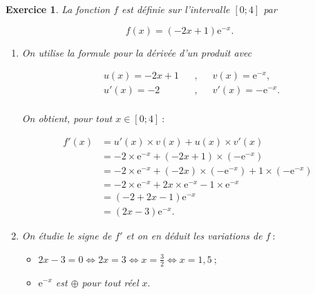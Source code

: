 \documentclass[10pt]{article}
\newtheorem{exo}{Exercice}
\begin{document}
\begin{exo}

La fonction $f$ est définie sur l'intervalle $\left[0;4\right]$ par

\[ f(x) = (-2x+1)\text{e}^{-x}.\]

\begin{enumerate}
\item  On utilise la formule pour la dérivée d'un produit avec

\begin{align*}
&u(x)=-2x+1&&,&& v(x)=\text{e}^{-x}, \\
& u'(x)=-2&&, &&v'(x)=-\text{e}^{-x}.\\
\end{align*}

On obtient, pour tout $x\in\left[0;4\right]~:$


\begin{align*}f'(x)&=u'(x)\times v(x)+u(x)\times v'(x)\\
&=-2\times\text{e}^{-x}+\left(-2x+1\right)\times \left(-\text{e}^{-x}\right)\\
&=-2\times\text{e}^{-x}+(-2x)\times\left(-\text{e}^{-x}\right)+1\times\left(-\text{e}^{-x}\right)\\
&=-2\times\text{e}^{-x}+2x\times\text{e}^{-x}-1\times\text{e}^{-x}\\
&=\left(-2+2x-1\right)\text{e}^{-x}\\
&=\left(2x-3\right)\text{e}^{-x}.
\end{align*}

\item On étudie le signe de $f'$ et on en déduit les variations de $f~:$

\begin{itemize}
\item[\textbullet] $2x-3=0\iff 2x=3\iff x=\frac{3}{2}\iff x=1,5~;$
\item[\textbullet] $\text{e}^{-x}$ est $\oplus$ pour tout réel $x.$
\end{itemize}

\medskip

\setlength{\columnseprule}{1pt}

\begin{multicols}{2}
\begin{center}
\end{center}


\end{multicols}
\end{enumerate}
\end{exo}
\end{document}
